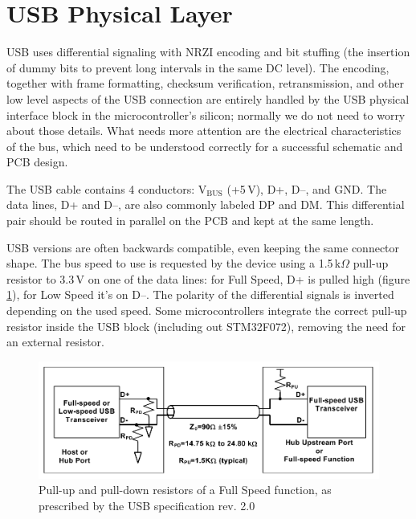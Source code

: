 

\newpage


\section{USB Physical Layer}

\gls{USB} uses differential signaling with \gls{NRZI} encoding and bit stuffing (the insertion of dummy bits to prevent long intervals in the same \gls{DC} level). The encoding, together with frame formatting, checksum verification, retransmission, and other low level aspects of the \gls{USB} connection are entirely handled by the \gls{USB} physical interface block in the microcontroller's silicon; normally we do not need to worry about those details. What needs more attention are the electrical characteristics of the bus, which need to be understood correctly for a successful schematic and \gls{PCB} design.

\noindent
The \gls{USB} cable contains 4 conductors: V$_\mathrm{BUS}$ (+5\,V), D+, D--, and \gls{GND}. The data lines, D+ and D--, are also commonly labeled DP and DM. This differential pair should be routed in parallel on the \gls{PCB} and kept at the same length.

\gls{USB} versions are often backwards compatible, even keeping the same connector shape. The bus speed to use is requested by the device using a 1.5\,k$\Omega$ pull-up resistor to 3.3\,V on one of the data lines: for Full Speed, D+ is pulled high (figure \ref{fig:usb-pullup-fs}), for Low Speed it's on D--. The polarity of the differential signals is inverted depending on the used speed. Some microcontrollers integrate the correct pull-up resistor inside the \gls{USB} block (including out STM32F072), removing the need for an external resistor.

\begin{figure}
	\centering
	\includegraphics[width=.8\textwidth]{img/usb-pullup-fs.png}
	\caption[USB pull-ups]{\label{fig:usb-pullup-fs}Pull-up and pull-down resistors of a Full Speed function, as prescribed by the USB specification rev. 2.0}
\end{figure}

